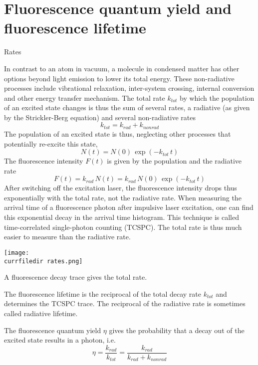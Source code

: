 \section{Fluorescence quantum yield and fluorescence lifetime} 


\begin{marginfigure}

  \caption{Rates}
\end{marginfigure}


In contrast to an atom in vacuum, a molecule in condensed matter has other options beyond light emission to lower its total energy. These non-radiative processes include vibrational relaxation, inter-system crossing, internal conversion and other energy transfer mechanism. The total rate $k_{tot}$ by which the population of an excited state changes is thus the sum of several rates, a radiative  (as given by the Strickler-Berg equation) and several non-radiative rates 
\[
 k_{tot} = k_{rad} + k_{non rad} 
\]
%
The population of an excited state is thus, neglecting other processes that  potentially re-excite this state,
\[
 N(t) = N(0) \, \exp \left( - k_{tot}  \,t \right)
\]
The fluorescence intensity $F(t)$ is given by the population and the radiative rate
\[
 F(t) = k_{rad} \, N(t) = k_{rad} \,  N(0) \, \exp \left( - k_{tot} \, t \right)
\]
After switching off the excitation laser, the fluorescence intensity drops thus exponentially with the total rate, not the radiative rate. When measuring the arrival time of a fluorescence photon after impulsive laser excitation, one can find this exponential decay in the arrival time histogram. This technique is called time-correlated single-photon counting (TCSPC). The total rate is thus much easier to measure than the radiative rate. 


\begin{marginfigure}
   \texttt{[image: \\currfiledir rates.png]}
  \caption{A fluorescence decay trace gives the total rate.}
\end{marginfigure}


The fluorescence lifetime is the reciprocal of the total decay rate $k_{tot}$ and determines the TCSPC trace. The reciprocal of the radiative rate is sometimes called radiative lifetime.

The fluorescence quantum yield $\eta$ gives the probability that a decay out of the excited state results in a photon, i.e.
\[
 \eta   = \frac{k_{rad}}{k_{tot}} = \frac{k_{rad}}{k_{rad} + k_{non rad}}
\]














\printbibliography[segment=\therefsegment,heading=subbibliography]
